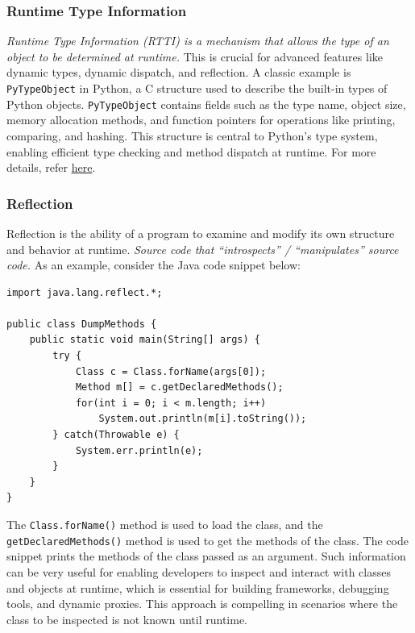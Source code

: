 \documentclass[11pt,paper=a4,answers]{exam}
\begin{document}
\subsubsection{Runtime Type Information}
\textit{Runtime Type Information (RTTI) is a mechanism that allows the type of an object to be determined at runtime.} This is crucial for advanced features like dynamic types, dynamic dispatch, and reflection. A classic example is \texttt{PyTypeObject} in Python, a C structure used to describe the built-in types of Python objects. \texttt{PyTypeObject} contains fields such as the type name, object size, memory allocation methods, and function pointers for operations like printing, comparing, and hashing. This structure is central to Python's type system, enabling efficient type checking and method dispatch at runtime. For more details, refer \href{https://docs.python.org/3/c-api/type.html#c.PyTypeObject}{here}.

\subsubsection{Reflection}
Reflection is the ability of a program to examine and modify its own structure and behavior at runtime. 
\textit{Source code that “introspects” / “manipulates” source code.} As an example, consider the Java code snippet below:
\begin{lstlisting}[style=javaStyle]
import java.lang.reflect.*;

public class DumpMethods {
    public static void main(String[] args) {
        try {
            Class c = Class.forName(args[0]);
            Method m[] = c.getDeclaredMethods();
            for(int i = 0; i < m.length; i++)
                System.out.println(m[i].toString());
        } catch(Throwable e) {
            System.err.println(e);
        }
    }
}
\end{lstlisting}
 The \texttt{Class.forName()} method is used to load the class, and the \texttt{getDeclaredMethods()} method is used to get the methods of the class. The code snippet prints the methods of the class passed as an argument. Such information can be very useful for enabling developers to inspect and interact with classes and objects at runtime, which is essential for building frameworks, debugging tools, and dynamic proxies. This approach is compelling in scenarios where the class to be inspected is not known until runtime.

\end{document}
